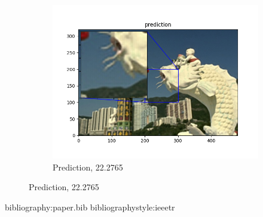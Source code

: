 \documentclass[12pt]{article}
\begin{document}
\begin{figure}[h!]
\begin{subfigure}[b]{0.32\linewidth}
    \includegraphics[width=\linewidth]{./9-prediction.png}
    \caption{Prediction, 22.2765}
  \end{subfigure}

\end{figure}        

bibliography:paper.bib
bibliographystyle:ieeetr
\end{document}
